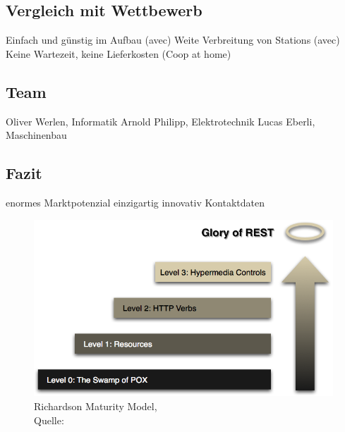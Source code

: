 \subsection{Vergleich mit Wettbewerb}
Einfach und günstig im Aufbau (avec)
Weite Verbreitung von Stations (avec)
Keine Wartezeit, keine Lieferkosten (Coop at home) 
                                                                                                             
\subsection{Team}
Oliver Werlen, Informatik
Arnold Philipp, Elektrotechnik
Lucas Eberli, Maschinenbau

\subsection{Fazit}
enormes Marktpotenzial
einzigartig
innovativ
Kontaktdaten

\begin{figure}[H]
	\centering
	\includegraphics[scale=0.3]{images/richardsonMaturity.png}
	\caption[Richardson Maturity Model]{Richardson Maturity Model,\\ Quelle: \cite{richardsonMaturity}}
	\label{img: richardsonMaturity}
\end{figure}



